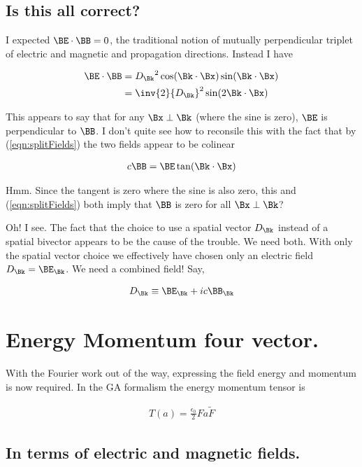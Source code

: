 \documentclass[]{eliblog}
\begin{document}
\subsection{Is this all correct?}

I expected $\BE \cdot \BB = 0$, the traditional notion of mutually perpendicular triplet of electric and magnetic and propagation directions.
Instead I have

\begin{align*}
\BE \cdot \BB 
&= {D_\Bk}^2 \cos(\Bk \cdot \Bx) \sin(\Bk \cdot \Bx) \\
&= \inv{2} {D_\Bk}^2 \sin( 2 \Bk \cdot \Bx) 
\end{align*}

This appears to say that for any $\Bx \perp \Bk$ (where the sine is zero), $\BE$ is perpendicular to $\BB$.  I don't quite see how to reconsile this with the fact that by 
(\ref{eqn:splitFields})
the two fields appear to be colinear

\begin{align*}
c \BB = \BE \tan(\Bk \cdot \Bx)
\end{align*}

Hmm.  Since the tangent is zero where the sine is also zero, this and (\ref{eqn:splitFields}) both imply that $\BB$ is zero for all $\Bx \perp \Bk$?

Oh!  I see.  The fact that the choice to use a spatial vector $D_\Bk$ instead of a spatial bivector appears to be the cause of the trouble.  We need
both.  With only the spatial vector choice we effectively have chosen only an electric field $D_\Bk = \BE_\Bk$.  We need a combined field!  Say,

\begin{align*}
D_\Bk \equiv \BE_\Bk + i c \BB_\Bk
\end{align*}

\section{Energy Momentum four vector.}

With the Fourier work out of the way, expressing the field energy and momentum is now required.  In the GA
formalism the energy momentum tensor is

\begin{align}
T(a) = \frac{\epsilon_0}{2} F a \tilde{F}
\end{align}

\subsection{ In terms of electric and magnetic fields. }
\end{document}
